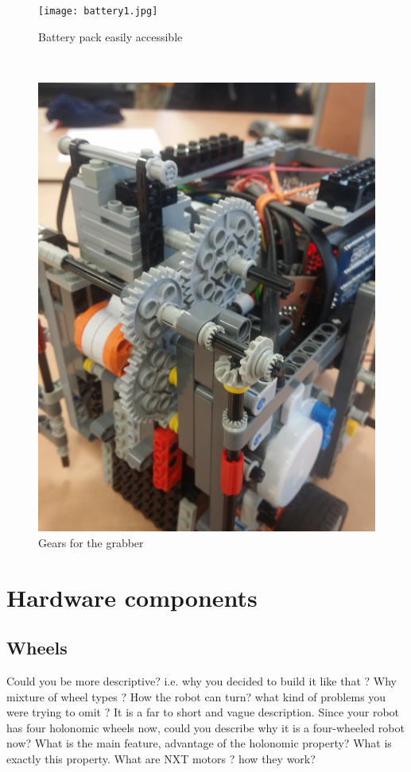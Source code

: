 \documentclass[a4paper,12pt]{article}
\begin{document}
\begin{figure}
	\centering
	\begin{minipage}[b]{.48\textwidth}
        \centering
		\texttt{[image: battery1.jpg]}
		\caption{Battery pack easily accessible}
		\label{fig:battery}
	\end{minipage}
	~
	\begin{minipage}[b]{.48\textwidth}
        \centering
		\includegraphics[scale=.065,angle=-90]{gears.jpg}
		\caption{Gears for the grabber}
		\label{fig:gears}
	\end{minipage}
	
\end{figure}


\section{Hardware components}

\subsection{Wheels}
Could you be more descriptive? i.e. why you decided to build it like that ? Why mixture of wheel types ? How the robot can turn? what kind of problems you were trying to omit ? It is a far to short and vague description.  Since your robot has four holonomic wheels now, could you describe why it is a four-wheeled robot now? What is the main feature, advantage of the holonomic property? What is exactly this property.  What are NXT motors ? how they work?
\end{document}
